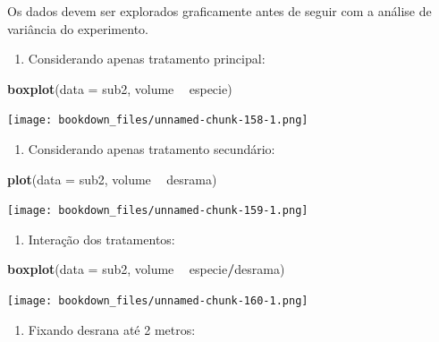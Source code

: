 \documentclass[
]{article}
\newenvironment{Shaded}{\begin{snugshade}}{\end{snugshade}}
\newcommand{\DataTypeTok}[1]{\textcolor[rgb]{0.13,0.29,0.53}{#1}}
\newcommand{\KeywordTok}[1]{\textcolor[rgb]{0.13,0.29,0.53}{\textbf{#1}}}
\newcommand{\NormalTok}[1]{#1}
\newcommand{\OperatorTok}[1]{\textcolor[rgb]{0.81,0.36,0.00}{\textbf{#1}}}
\newcommand{\StringTok}[1]{\textcolor[rgb]{0.31,0.60,0.02}{#1}}
\providecommand{\tightlist}{%
  \setlength{\itemsep}{0pt}\setlength{\parskip}{0pt}}
\begin{document}
Os dados devem ser explorados graficamente antes de seguir com a análise de variância do experimento.

\begin{enumerate}
\def\labelenumi{\arabic{enumi}.}
\tightlist
\item
  Considerando apenas tratamento principal:
\end{enumerate}

\begin{Shaded}
\begin{Highlighting}[]
\KeywordTok{boxplot}\NormalTok{(}\DataTypeTok{data =}\NormalTok{ sub2, volume }\OperatorTok{~}\StringTok{ }\NormalTok{especie)}
\end{Highlighting}
\end{Shaded}

\texttt{[image: bookdown\_files/unnamed-chunk-158-1.png]}

\begin{enumerate}
\def\labelenumi{\arabic{enumi}.}
\setcounter{enumi}{1}
\tightlist
\item
  Considerando apenas tratamento secundário:
\end{enumerate}

\begin{Shaded}
\begin{Highlighting}[]
\KeywordTok{plot}\NormalTok{(}\DataTypeTok{data =}\NormalTok{ sub2, volume }\OperatorTok{~}\StringTok{ }\NormalTok{desrama)}
\end{Highlighting}
\end{Shaded}

\texttt{[image: bookdown\_files/unnamed-chunk-159-1.png]}

\begin{enumerate}
\def\labelenumi{\arabic{enumi}.}
\setcounter{enumi}{2}
\tightlist
\item
  Interação dos tratamentos:
\end{enumerate}

\begin{Shaded}
\begin{Highlighting}[]
\KeywordTok{boxplot}\NormalTok{(}\DataTypeTok{data =}\NormalTok{ sub2, volume }\OperatorTok{~}\StringTok{ }\NormalTok{especie}\OperatorTok{/}\NormalTok{desrama)}
\end{Highlighting}
\end{Shaded}

\texttt{[image: bookdown\_files/unnamed-chunk-160-1.png]}

\begin{enumerate}
\def\labelenumi{\arabic{enumi}.}
\setcounter{enumi}{3}
\tightlist
\item
  Fixando desrana até 2 metros:
\end{enumerate}
\end{document}
